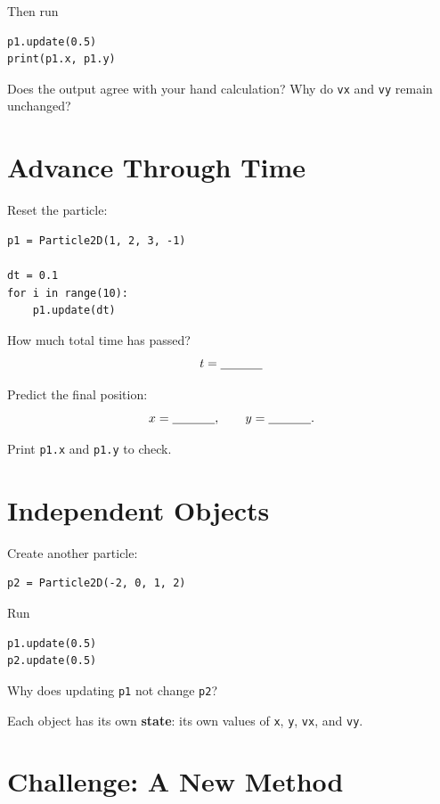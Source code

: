 \documentclass{article}
\begin{document}
Then run

\begin{verbatim}
p1.update(0.5)
print(p1.x, p1.y)
\end{verbatim}

Does the output agree with your hand calculation?  Why do
\texttt{vx} and \texttt{vy} remain unchanged?

\section{Advance Through Time}

Reset the particle:

\begin{verbatim}
p1 = Particle2D(1, 2, 3, -1)

dt = 0.1
for i in range(10):
    p1.update(dt)
\end{verbatim}

How much total time has passed?
\[
t=\underline{\hspace{1.2cm}}
\]

Predict the final position:
\[
x=\underline{\hspace{1.2cm}},\qquad
y=\underline{\hspace{1.2cm}}.
\]

Print \texttt{p1.x} and \texttt{p1.y} to check.

\section{Independent Objects}

Create another particle:

\begin{verbatim}
p2 = Particle2D(-2, 0, 1, 2)
\end{verbatim}

Run

\begin{verbatim}
p1.update(0.5)
p2.update(0.5)
\end{verbatim}

Why does updating \texttt{p1} not change \texttt{p2}?

\medskip
Each object has its own \textbf{state}: its own values of
\texttt{x}, \texttt{y}, \texttt{vx}, and \texttt{vy}.

\section{Challenge: A New Method}
\end{document}
